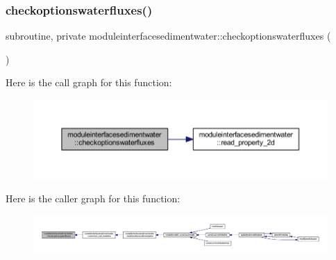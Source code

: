 \subsubsection{\texorpdfstring{checkoptionswaterfluxes()}{checkoptionswaterfluxes()}}
{\footnotesize\ttfamily subroutine, private moduleinterfacesedimentwater\+::checkoptionswaterfluxes (\begin{DoxyParamCaption}{ }\end{DoxyParamCaption})\hspace{0.3cm}{\ttfamily [private]}}

Here is the call graph for this function\+:\nopagebreak
\begin{figure}[H]
\begin{center}
\leavevmode
\includegraphics[width=350pt]{namespacemoduleinterfacesedimentwater_a3d7dba6457e9607bdd56867fc1e7516c_cgraph}
\end{center}
\end{figure}
Here is the caller graph for this function\+:\nopagebreak
\begin{figure}[H]
\begin{center}
\leavevmode
\includegraphics[width=350pt]{namespacemoduleinterfacesedimentwater_a3d7dba6457e9607bdd56867fc1e7516c_icgraph}
\end{center}
\end{figure}
\mbox{\label{namespacemoduleinterfacesedimentwater_ab7293afe1dc4a5090663cd0d773d6e88}} 

